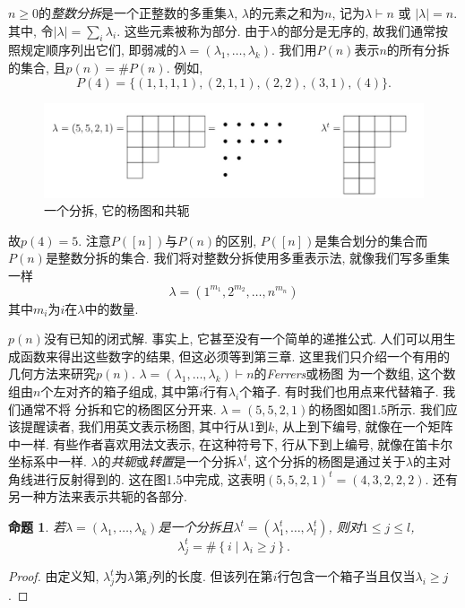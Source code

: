 \documentclass{ctexbook}
\newtheorem{propo}[thm]{命题}
\begin{document}
$n \geqslant 0$的\textsl{整数分拆}是一个正整数的多重集$\lambda$, $\lambda$的元素之和为$n$, 记为$\lambda \vdash n$ 或 $|\lambda|=n$.
其中, 令$|\lambda|=\sum_{i} \lambda_{i}$. 这些元素被称为部分. 由于$\lambda$的部分是无序的, 故我们通常按照规定顺序列出它们, 即弱减的$\lambda=\left(\lambda_{1}, \ldots, \lambda_{k}\right)$.
我们用$P(n)$表示$n$的所有分拆的集合, 且$p(n)=\# P(n)$. 例如,
$$
P(4)=\{(1,1,1,1),(2,1,1),(2,2),(3,1),(4)\}.
$$

\begin{figure}
    \centering
    \includegraphics[scale=0.3]{./fig1/figure1.5.jpg}
    \caption{一个分拆, 它的杨图和共轭}
\end{figure}


\noindent 故$p(4)=5$. 注意$P([n])$与$P(n)$的区别, $P([n])$是集合划分的集合而$P(n)$是整数分拆的集合. 我们将对整数分拆使用多重表示法,
就像我们写多重集一样
$$
\lambda=\left(1^{m_{1}}, 2^{m_{2}}, \ldots, n^{m_{n}}\right)
$$
其中$m_{i}$为$i$在$\lambda$中的数量.

$p(n)$没有已知的闭式解. 事实上, 它甚至没有一个简单的递推公式. 人们可以用生成函数来得出这些数字的结果, 但这必须等到第三章.
这里我们只介绍一个有用的几何方法来研究$p(n)$. $\lambda=\left(\lambda_{1}, \ldots, \lambda_{k}\right) \vdash n$的\textsl{Ferrers}或杨图
为一个数组, 这个数组由$n$个左对齐的箱子组成, 其中第$i$行有$\lambda_{i}$个箱子. 有时我们也用点来代替箱子. 我们通常不将
分拆和它的杨图区分开来. $\lambda=(5,5,2,1)$的杨图如图1.5所示. 我们应该提醒读者, 我们用英文表示杨图, 其中行从1到$k$, 从上到下编号,
就像在一个矩阵中一样. 有些作者喜欢用法文表示, 在这种符号下, 行从下到上编号, 就像在笛卡尔坐标系中一样.
$\lambda$的\textsl{共轭}或\textsl{转置}是一个分拆$\lambda^{t}$, 这个分拆的杨图是通过关于$\lambda$的主对角线进行反射得到的.
这在图1.5中完成, 这表明$(5,5,2,1)^{t}=(4,3,2,2,2)$. 还有另一种方法来表示共轭的各部分.
  \begin{propo}
	若$\lambda=\left(\lambda_{1}, \ldots, \lambda_{k}\right)$是一个分拆且$\lambda^{t}=\left(\lambda_{1}^{t}, \ldots, \lambda_{l}^{t}\right)$, 则对$1 \leqslant j \leqslant l$,
	$$
	\lambda_{j}^{t}=\#\left\{i \mid \lambda_{i} \geqslant j\right\}.
	$$
   \end{propo}
   \begin{proof}
	由定义知, $\lambda_{j}^{t}$为$\lambda$第$j$列的长度. 但该列在第$i$行包含一个箱子当且仅当$\lambda_{i} \geqslant j$.
    \end{proof}
\end{document}
